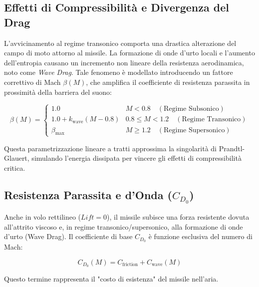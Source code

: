 \documentclass[12pt,a4paper]{article}
\begin{document}
\subsection{Effetti di Compressibilità e Divergenza del Drag}

L'avvicinamento al regime transonico comporta una drastica alterazione del campo di moto attorno al missile. La formazione di onde d'urto locali e l'aumento dell'entropia causano un incremento non lineare della resistenza aerodinamica, noto come \textit{Wave Drag}.
Tale fenomeno è modellato introducendo un fattore correttivo di Mach $\beta(M)$, che amplifica il coefficiente di resistenza parassita in prossimità della barriera del suono:

\begin{equation}
    \beta(M) =
    \begin{cases}
        1.0 & M < 0.8 \quad (\text{Regime Subsonico}) \\[6pt]
        1.0 + k_{\text{wave}} (M - 0.8) & 0.8 \le M < 1.2 \quad (\text{Regime Transonico}) \\[6pt]
        \beta_{\max} & M \ge 1.2 \quad (\text{Regime Supersonico})
    \end{cases}
\end{equation}

Questa parametrizzazione lineare a tratti approssima la singolarità di Prandtl-Glauert, simulando l'energia dissipata per vincere gli effetti di compressibilità critica.

\subsection{Resistenza Parassita e d'Onda ($C_{D_0}$)}
Anche in volo rettilineo ($Lift = 0$), il missile subisce una forza resistente dovuta all'attrito viscoso e, in regime transonico/supersonico, alla formazione di onde d'urto (Wave Drag).
Il coefficiente di base $C_{D_0}$ è funzione esclusiva del numero di Mach:

\begin{equation}
    C_{D_0}(M) = C_{\text{friction}} + C_{\text{wave}}(M)
\end{equation}

Questo termine rappresenta il "costo di esistenza" del missile nell'aria.
\end{document}
